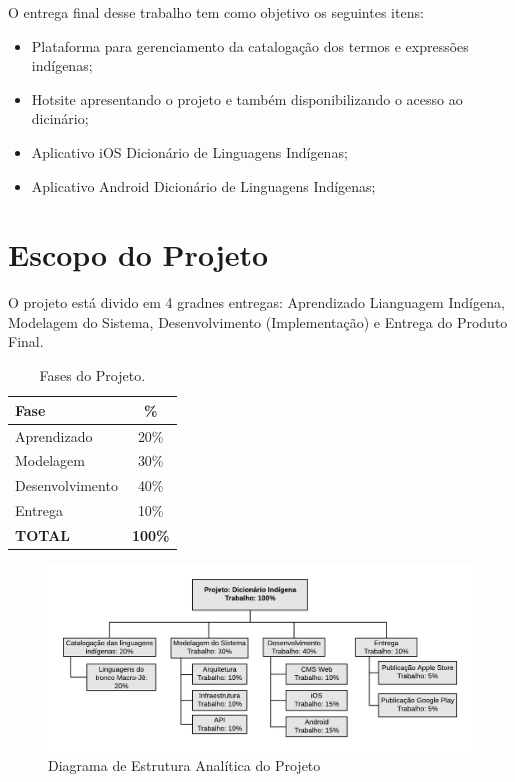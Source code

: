 \documentclass[journal]{IEEEtran}
\begin{document}
O entrega final desse trabalho tem como objetivo os seguintes itens:

\begin{itemize}
    \item Plataforma para gerenciamento da catalogação dos termos e expressões indígenas;
    \item Hotsite apresentando o projeto e também disponibilizando o acesso ao dicinário;
    \item Aplicativo iOS Dicionário de Linguagens Indígenas;
    \item Aplicativo Android Dicionário de Linguagens Indígenas;
\end{itemize}

\section{Escopo do Projeto}

O projeto está divido em 4 gradnes entregas: Aprendizado Lianguagem Indígena, Modelagem do Sistema, Desenvolvimento (Implementação) e Entrega do Produto Final.

\begin{table}[!ht] 
	\centering
	\caption{Fases do Projeto.}
		\begin{tabular}{l|c}
			\hline
				{\bf Fase} & {\bf \%}\\
			\hline
				Aprendizado     & 20\% \\
				Modelagem       & 30\% \\
				Desenvolvimento & 40\% \\
				Entrega         & 10\% \\
			\hline
				{\bf TOTAL} & {\bf 100\%}\\
			\hline
		\end{tabular}
	\label{t:modelo}
\end{table}

\begin{figure}[!ht]
	\centering
	\includegraphics[scale=0.55]{eap.png}
	\caption{Diagrama de Estrutura Analítica do Projeto}
	\label{f:latex12c}
\end{figure}
\end{document}
